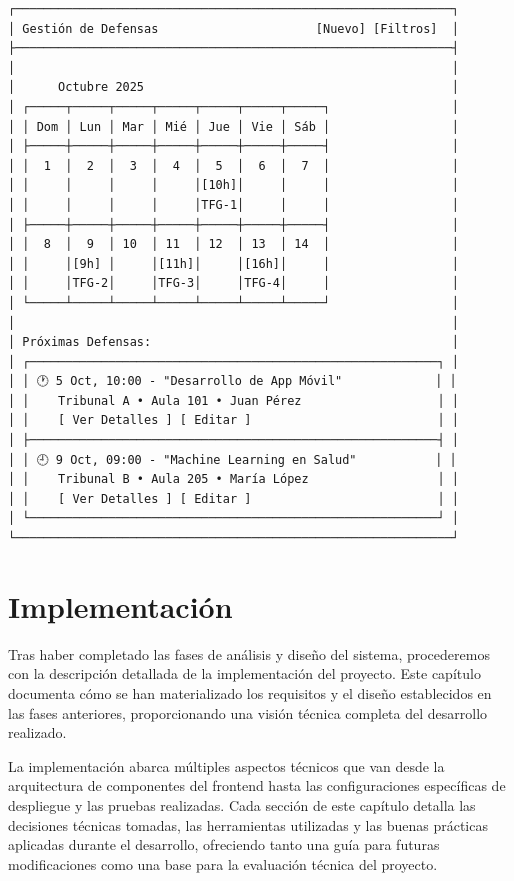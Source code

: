\documentclass[12pt,a4paper,oneside]{report}
\begin{document}
\begin{lstlisting}
┌─────────────────────────────────────────────────────────────┐
│ Gestión de Defensas                      [Nuevo] [Filtros]  │
├─────────────────────────────────────────────────────────────┤
│                                                             │
│      Octubre 2025                                           │
│ ┌─────┬─────┬─────┬─────┬─────┬─────┬─────┐                 │
│ │ Dom │ Lun │ Mar │ Mié │ Jue │ Vie │ Sáb │                 │
│ ├─────┼─────┼─────┼─────┼─────┼─────┼─────┤                 │
│ │  1  │  2  │  3  │  4  │  5  │  6  │  7  │                 │
│ │     │     │     │     │[10h]│     │     │                 │
│ │     │     │     │     │TFG-1│     │     │                 │
│ ├─────┼─────┼─────┼─────┼─────┼─────┼─────┤                 │
│ │  8  │  9  │ 10  │ 11  │ 12  │ 13  │ 14  │                 │
│ │     │[9h] │     │[11h]│     │[16h]│     │                 │
│ │     │TFG-2│     │TFG-3│     │TFG-4│     │                 │
│ └─────┴─────┴─────┴─────┴─────┴─────┴─────┘                 │
│                                                             │
│ Próximas Defensas:                                          │
│ ┌─────────────────────────────────────────────────────────┐ │
│ │ 🕐 5 Oct, 10:00 - "Desarrollo de App Móvil"             │ │
│ │    Tribunal A • Aula 101 • Juan Pérez                   │ │
│ │    [ Ver Detalles ] [ Editar ]                          │ │
│ ├─────────────────────────────────────────────────────────┤ │
│ │ 🕘 9 Oct, 09:00 - "Machine Learning en Salud"           │ │
│ │    Tribunal B • Aula 205 • María López                  │ │
│ │    [ Ver Detalles ] [ Editar ]                          │ │
│ └─────────────────────────────────────────────────────────┘ │
└─────────────────────────────────────────────────────────────┘
\end{lstlisting}

\chapter{Implementación}\label{implementaciuxf3n}

Tras haber completado las fases de análisis y diseño del sistema,
procederemos con la descripción detallada de la implementación del
proyecto. Este capítulo documenta cómo se han materializado los
requisitos y el diseño establecidos en las fases anteriores,
proporcionando una visión técnica completa del desarrollo realizado.

La implementación abarca múltiples aspectos técnicos que van desde la
arquitectura de componentes del frontend hasta las configuraciones
específicas de despliegue y las pruebas realizadas. Cada sección de este
capítulo detalla las decisiones técnicas tomadas, las herramientas
utilizadas y las buenas prácticas aplicadas durante el desarrollo,
ofreciendo tanto una guía para futuras modificaciones como una base para
la evaluación técnica del proyecto.
\end{document}
